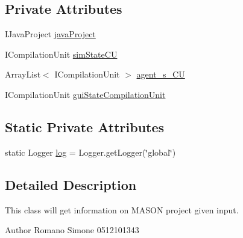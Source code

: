 \subsection*{Private Attributes}
\begin{DoxyCompactItemize}
\item 
I\-Java\-Project \hyperlink{classit_1_1isislab_1_1masonhelperdocumentation_1_1analizer_1_1_project_analizer_a8df706a1af9fdd057124a0e0d13a675d}{java\-Project}
\item 
I\-Compilation\-Unit \hyperlink{classit_1_1isislab_1_1masonhelperdocumentation_1_1analizer_1_1_project_analizer_a0fca1d0eb206f331ea5079aa3e6c9fe7}{sim\-State\-C\-U}
\item 
Array\-List$<$ I\-Compilation\-Unit $>$ \hyperlink{classit_1_1isislab_1_1masonhelperdocumentation_1_1analizer_1_1_project_analizer_ad495cee63b37e3bf36c81ccf896f9ce2}{agent\-\_\-s\-\_\-\-C\-U}
\item 
I\-Compilation\-Unit \hyperlink{classit_1_1isislab_1_1masonhelperdocumentation_1_1analizer_1_1_project_analizer_a8e78e7052513210efe689d569da31826}{gui\-State\-Compilation\-Unit}
\end{DoxyCompactItemize}
\subsection*{Static Private Attributes}
\begin{DoxyCompactItemize}
\item 
static Logger \hyperlink{classit_1_1isislab_1_1masonhelperdocumentation_1_1analizer_1_1_project_analizer_a3a2698c8ab70661f2656b194d35c5dd7}{log} = Logger.\-get\-Logger(\char`\"{}global\char`\"{})
\end{DoxyCompactItemize}


\subsection{Detailed Description}
This class will get information on M\-A\-S\-O\-N project given input. \begin{DoxyAuthor}{Author}
Romano Simone 0512101343 
\end{DoxyAuthor}


